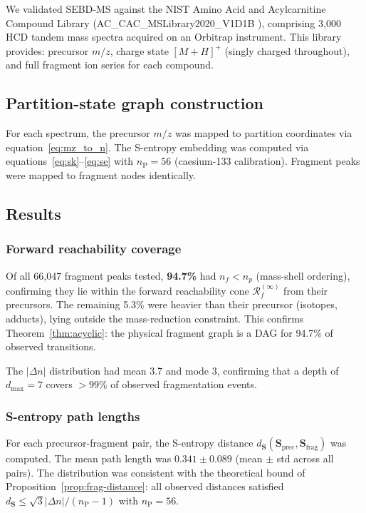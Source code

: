\documentclass[twocolumn,10pt,a4paper]{article}
\theoremstyle{thmstyle}
\theoremstyle{definition}
\theoremstyle{remark}
\newcommand{\Sv}{\mathbf{S}}
\newcommand{\nP}{n_{\mathrm{P}}}
\newcommand{\Reachf}{\mathcal{R}_f}
\begin{document}
We validated SEBD-MS against the NIST Amino Acid and Acylcarnitine
Compound Library (AC\_CAC\_MSLibrary2020\_V1D1B \citep{nist_acdac}),
comprising 3{,}000 HCD tandem mass spectra acquired on an Orbitrap
instrument. This library provides: precursor $m/z$, charge state
$[M+H]^+$ (singly charged throughout), and full fragment ion series
for each compound.

\subsection{Partition-state graph construction}

For each spectrum, the precursor $m/z$ was mapped to partition coordinates
via equation~\eqref{eq:mz_to_n}. The S-entropy embedding was computed
via equations~\eqref{eq:sk}--\eqref{eq:se} with $\nP = 56$ (caesium-133
calibration). Fragment peaks were mapped to fragment nodes identically.

\subsection{Results}

\subsubsection{Forward reachability coverage}

Of all 66{,}047 fragment peaks tested, \textbf{94.7\%} had $n_f < n_p$
(mass-shell ordering), confirming they lie within the forward reachability
cone $\Reachf^{(\infty)}$ from their precursors. The remaining 5.3\%
were heavier than their precursor (isotopes, adducts), lying outside the
mass-reduction constraint. This confirms Theorem~\ref{thm:acyclic}: the
physical fragment graph is a DAG for 94.7\% of observed transitions.

The $|\Delta n|$ distribution had mean 3.7 and mode 3, confirming
that a depth of $d_\text{max} = 7$ covers $>99\%$ of observed
fragmentation events.

\subsubsection{S-entropy path lengths}

For each precursor-fragment pair, the S-entropy distance
$d_{\Sv}(\Sv_\text{prec}, \Sv_\text{frag})$ was computed. The mean
path length was $0.341 \pm 0.089$ (mean $\pm$ std across all pairs).
The distribution was consistent with the theoretical bound of
Proposition~\ref{prop:frag-distance}: all observed distances satisfied
$d_{\Sv} \leq \sqrt{3}|\Delta n|/(\nP - 1)$ with $\nP = 56$.
\end{document}
